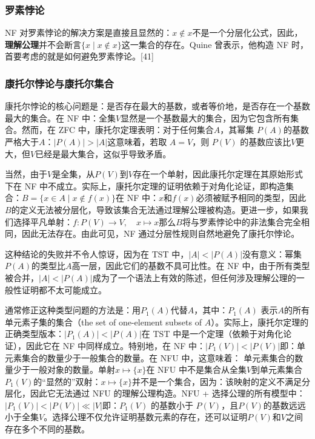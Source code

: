 \subsubsection{罗素悖论}
NF 对罗素悖论的解决方案是直接且显然的：\( x \notin x \)不是一个分层化公式，因此，\textbf{理解公理}并不会断言\(\{x \mid x \notin x\}\)这一集合的存在。Quine 曾表示，他构造 NF 时，首要考虑的就是如何避免罗素悖论。[41]
\subsubsection{康托尔悖论与康托尔集合}
康托尔悖论的核心问题是：是否存在最大的基数，或者等价地，是否存在一个基数最大的集合。在 NF 中：全集\( V \)显然是一个基数最大的集合，因为它包含所有集合。然而，在 ZFC 中，康托尔定理表明：对于任何集合\( A \)，其幂集 \( P(A)\)的基数严格大于\( A \)：\(|P(A)| > |A|\)这意味着，若取 \( A = V \)，则 \( P(V) \) 的基数应该比\( V \)更大，但\( V \)已经是最大集合，这似乎导致矛盾。

当然，由于\( V \)是全集，从\( P(V) \)到\( V \)存在一个单射，因此康托尔定理在其原始形式下在 NF 中不成立。实际上，康托尔定理的证明依赖于对角化论证，即构造集合：\(B = \{ x \in A \mid x \notin f(x) \}\)在 NF 中：\( x \)和\(f(x)\)必须被赋予相同的类型，因此\( B \)的定义无法被分层化，导致该集合无法通过理解公理被构造。更进一步，如果我们选择平凡单射：\(f: P(V) \to V, \quad x \mapsto x\)那么\(B\)将与罗素悖论中的非法集合完全相同，因此无法存在。由此可见，NF 通过分层性规则自然地避免了康托尔悖论。

这种结论的失败并不令人惊讶，因为在 TST 中，\(|A| < |P(A)|\)没有意义：幂集\(P(A)\)的类型比\(A\)高一层，因此它们的基数不具可比性。在 NF 中，由于所有类型被合并，\(|A| < |P(A)|\)成为了一个语法上有效的陈述，但任何涉及理解公理的一般性证明都不太可能成立。

通常修正这种类型问题的方法是：用\( P_1(A) \)代替\( A \)，其中：\(P_1(A)\)
表示\( A \)的所有单元素子集的集合（the set of one-element subsets of \( A \)）。实际上，康托尔定理的正确类型版本：\(|P_1(A)| < |P(A)|\)在 TST 中是一个定理（依赖于对角化论证），因此它在 NF 中同样成立。特别地，在 NF 中：\(|P_1(V)| < |P(V)|\)即：单元素集合的数量少于一般集合的数量。在 NFU 中，这意味着：
单元素集合的数量少于一般对象的数量。单射\( x \mapsto \{x\} \)在 NFU 中不是集合从全集\( V \)到单元素集合\(P_1(V)\)的“显然的”双射：\(x \mapsto \{x\}\)并不是一个集合，因为：该映射的定义不满足分层化，因此它无法通过 NFU 的理解公理构造。NFU + 选择公理的所有模型中：\(|P_1(V)| < |P(V)| \ll |V|\)即：\( P_1(V) \) 的基数小于 \( P(V) \)，且\( P(V) \)的基数远远小于全集\( V \)。选择公理不仅允许证明基数元素的存在，还可以证明\(P(V)\)和\( V \)之间存在多个不同的基数。

